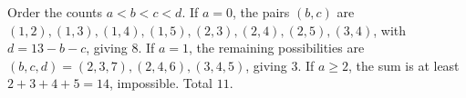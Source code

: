 Order the counts $a<b<c<d$. If $a=0$, the pairs $(b,c)$ are $(1,2),(1,3),(1,4),(1,5),(2,3),(2,4),(2,5),(3,4)$, with $d=13-b-c$, giving 8. If $a=1$, the remaining possibilities are $(b,c,d)=(2,3,7),(2,4,6),(3,4,5)$, giving 3. If $a\ge2$, the sum is at least $2+3+4+5=14$, impossible. Total $\boxed{11}$.
